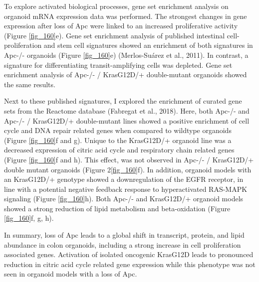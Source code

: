 \begin{flushleft}
To explore activated biological processes, gene set enrichment analysis on organoid mRNA expression data was performed. The strongest changes in gene expression after loss of Apc were linked to an increased proliferative activity (Figure \ref{fig_160}e). Gene set enrichment analysis of published intestinal cell-proliferation and stem cell signatures showed an enrichment of both signatures in Apc-/- organoids (Figure \ref{fig_160}e) (Merlos-Suárez et al., 2011). In contrast, a signature for differentiating transit-amplifying cells was depleted. Gene set enrichment analysis of Apc-/- / KrasG12D/+ double-mutant organoids showed the same results. 

Next to these published signatures, I explored the enrichment of curated gene sets from the Reactome database (Fabregat et al., 2018). Here, both Apc-/- and Apc-/- / KrasG12D/+ double-mutant lines showed a positive enrichment of cell cycle and DNA repair related genes when compared to wildtype organoids (Figure \ref{fig_160}f and g). Unique to the KrasG12D/+ organoid line was a decreased expression of citric acid cycle and respiratory chain related genes (Figure \ref{fig_160}f and h). This effect, was not observed in Apc-/- / KrasG12D/+ double mutant organoids (Figure 2\ref{fig_160}f). In addition, organoid models with an KrasG12D/+ genotype showed a downregulation of the EGFR receptor, in line with a potential negative feedback response to hyperactivated RAS-MAPK signaling (Figure \ref{fig_160}h). Both Apc-/- and KrasG12D/+ organoid models showed a strong reduction of lipid metabolism and beta-oxidation (Figure \ref{fig_160}f, g, h).

In summary, loss of Apc leads to a global shift in transcript, protein, and lipid abundance in colon organoids, including a strong increase in cell proliferation associated genes. Activation of isolated oncogenic KrasG12D leads to pronounced reduction in citric acid cycle related gene expression while this phenotype was not seen in organoid models with a loss of Apc.


\end{flushleft}
